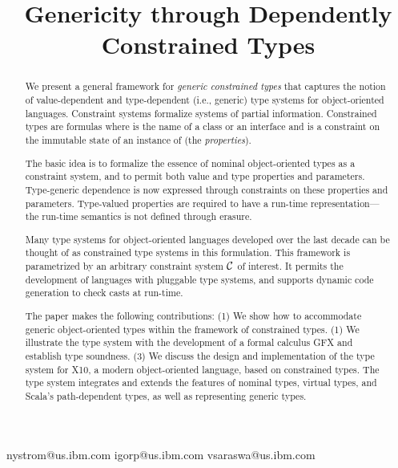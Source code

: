 \documentclass[preprint,nocopyrightspace,9pt]{sigplanconf}
\newif\iflncs
\newcommand\gxx{GFX\xspace}
\begin{document}
\title{Genericity through Dependently Constrained Types}

\iflncs

\author{
Nathaniel Nystrom\inst{1}
\and
Igor Peshansky\inst{1}
\and
Vijay Saraswat\inst{1}
}

\institute{IBM T.~J. Watson Research~Center,
P.O.~Box~704, Yorktown~Heights NY 10598 USA,
\email{\{nystrom,igorp,vsaraswa\}@us.ibm.com}}

\else

  {nystrom@us.ibm.com}
  {igorp@us.ibm.com}
  {vsaraswa@us.ibm.com}


\fi

\maketitle

\begin{abstract}
We present a general framework for \emph{generic constrained types}
that captures the notion of value-dependent and
type-dependent (i.e., generic) type systems for object-oriented
languages.  Constraint systems formalize systems of partial
information.  Constrained types are formulas  where
 is the name of a class or an interface and  is a
constraint on the immutable state of an instance of  (the
{\em properties}).

The basic idea is to formalize the essence of nominal
object-oriented types as a constraint system, and to permit both
value and type properties and parameters.  Type-generic
dependence is now expressed through constraints on these
properties and parameters.  Type-valued properties are required
to have a run-time representation---the run-time semantics is
not defined through erasure.

Many type systems for object-oriented languages developed over
the last decade can be thought of as constrained type systems in
this formulation.  This framework is parametrized by an
arbitrary constraint system $\cal C$ of interest.  It permits
the development of languages with pluggable type systems, and
supports dynamic code generation to check casts at run-time.

The paper makes the following contributions: (1) We show how to
accommodate generic object-oriented types within the framework of
constrained types. (1) We illustrate the type system with the
development of a formal calculus \gxx and establish type
soundness. (3) We discuss the design and implementation of the
type system for X10, a modern object-oriented language, based on
constrained types.  The type system integrates and extends the
features of nominal types, virtual types, and
Scala's path-dependent types, as well as representing generic
types.
\end{abstract}
\end{document}
